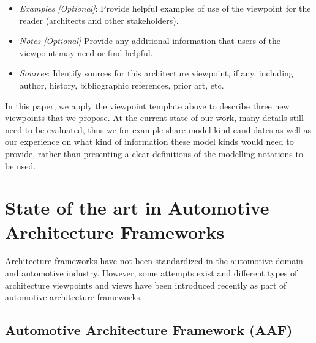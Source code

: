 \begin{itemize}
\item {\em Examples [Optional]}: 
Provide helpful examples of use of the viewpoint for the reader
(architects and other stakeholders).
\item {\em Notes [Optional]} Provide any additional information that users of the viewpoint may
need or find helpful.
\item {\em Sources}: Identify sources for this architecture viewpoint, if any,
  including author, history, bibliographic references, prior art, etc.
\end{itemize}

In this paper, we apply the viewpoint template above to describe three new viewpoints that we propose.
At the current state of our work, many details still need to be evaluated,
thus we for example share model kind candidates
as well as our experience on what kind of information these model kinds would need to provide,
rather than presenting a clear definitions of the modelling notations to be used.

\section{State of the art in Automotive Architecture Frameworks}\label{sec:automotiveAF}
Architecture frameworks have not been standardized in the automotive domain and automotive industry. 
However, some attempts exist and different types of architecture viewpoints and views have been introduced recently as part
of automotive architecture frameworks. 

\subsection{Automotive Architecture Framework (AAF)}

